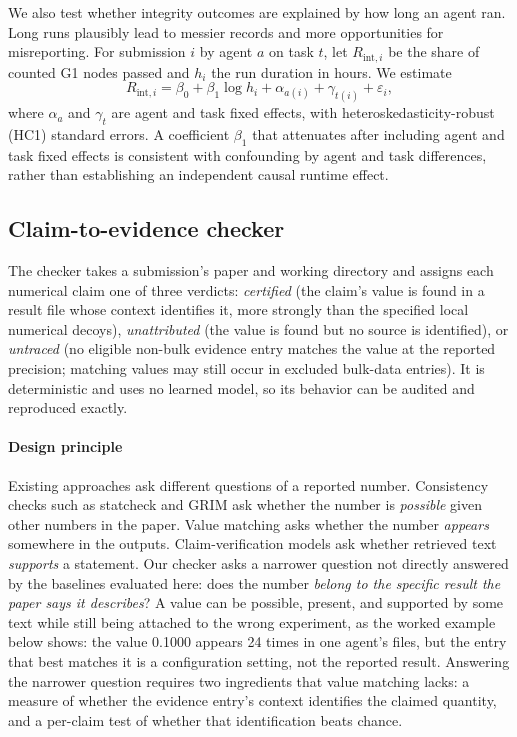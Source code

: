 \documentclass[preprint,12pt,authoryear]{elsarticle}
\begin{document}
We also test whether integrity outcomes are explained by how long an agent ran. Long runs plausibly lead to messier records and more opportunities for misreporting. For submission $i$ by agent $a$ on task $t$, let $R_{\text{int},i}$ be the share of counted G1 nodes passed and $h_i$ the run duration in hours. We estimate
\begin{equation}
R_{\text{int},i} = \beta_0 + \beta_1 \log h_i + \alpha_{a(i)} + \gamma_{t(i)} + \varepsilon_i,
\label{eq:fe}
\end{equation}
where $\alpha_a$ and $\gamma_t$ are agent and task fixed effects, with heteroskedasticity-robust (HC1) standard errors. A coefficient $\beta_1$ that attenuates after including agent and task fixed effects is consistent with confounding by agent and task differences, rather than establishing an independent causal runtime effect.

\subsection{Claim-to-evidence checker}\label{sec:checker}

The checker takes a submission's paper and working directory and assigns each numerical claim one of three verdicts: \emph{certified} (the claim's value is found in a result file whose context identifies it, more strongly than the specified local numerical decoys), \emph{unattributed} (the value is found but no source is identified), or \emph{untraced} (no eligible non-bulk evidence entry matches the value at the reported precision; matching values may still occur in excluded bulk-data entries). It is deterministic and uses no learned model, so its behavior can be audited and reproduced exactly.

\paragraph{Design principle} Existing approaches ask different questions of a reported number. Consistency checks such as statcheck and GRIM ask whether the number is \emph{possible} given other numbers in the paper. Value matching asks whether the number \emph{appears} somewhere in the outputs. Claim-verification models ask whether retrieved text \emph{supports} a statement. Our checker asks a narrower question not directly answered by the baselines evaluated here: does the number \emph{belong to the specific result the paper says it describes}? A value can be possible, present, and supported by some text while still being attached to the wrong experiment, as the worked example below shows: the value 0.1000 appears 24 times in one agent's files, but the entry that best matches it is a configuration setting, not the reported result. Answering the narrower question requires two ingredients that value matching lacks: a measure of whether the evidence entry's context identifies the claimed quantity, and a per-claim test of whether that identification beats chance.
\end{document}
